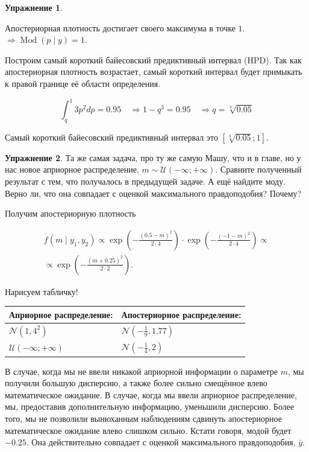 \documentclass[12pt, a4paper, oneside]{extreport}
\DeclareMathOperator{\Mod}{Mod}
\def \mN{\mathcal{N}}
\def \mU{\mathcal{U}}
\newcommand{\expp}[1]{ \exp \left( #1 \right)}
\theoremstyle{plain}              %
\theoremstyle{definition}         %
\newtheorem{problem}{\color{myblue} Упражнение}
\begin{document}
\begin{problem}
\begin{sol}
Апостериорная плотность достигает своего максимума в точке $1$. $\Rightarrow \Mod(p \mid y) = 1$.
			
			
Построим самый короткий байесовский предиктивный интервал (HPD). Так как апостериорная плотность возрастает, самый короткий интервал будет примыкать к правой границе её области определения.
			
\[ \int_q^1 3p^2 dp = 0.95 \quad \Rightarrow 1 - q^3 = 0.95 \quad \Rightarrow q = \sqrt[3]{0.05} \]

Самый короткий байесовский предиктивный интервал это $[\sqrt[3]{0.05};1]$.

\end{sol}
\end{problem}


\begin{problem}\label{upr_norm}
	Та же самая задача, про ту же самую Машу, что и в главе, но у нас новое априорное распределение, $m \sim \mU(-\infty; +\infty)$. Сравните полученный результат с тем, что получалось в предыдущей задаче. А ещё найдите моду. Верно ли, что она совпадает с оценкой максимального правдоподобия? Почему? 
	\begin{sol}
		
		Получим апостериорную плотность
		
		\begin{multline*}
		 f(m \mid y_1, y_2) \propto \expp{-\frac{(0.5 - m)^2}{2 \cdot 4}} \cdot \expp{-\frac{(-1 - m)^2}{2 \cdot 4}} \propto \\ \propto \expp{-\frac{(m+0.25)^2}{2 \cdot 2}}.
		 \end{multline*}
		
		Нарисуем табличку! 
		
		\begin{tabularx}{\textwidth}{X|X}
			Априорное распределение: & Апостериорное распределение: \\
			\hline 
			$\mN(1,4^2)$             &  $\mN(-\frac{1}{9},1.77)$ \\
			$\mU(-\infty;+\infty)$   &  $\mN(-\frac{1}{4},2)$
		\end{tabularx}
		
		В случае, когда мы не ввели никакой априорной информации о параметре $m$, мы получили большую дисперсию, а также более сильно смещённое влево математическое ожидание. В случае, когда мы ввели априорное распределение, мы, предоставив дополнительную информацию, уменьшили дисперсию. Более того, мы не позволили вынюханным наблюдениям сдвинуть апостериорное математическое ожидание влево слишком сильно. Кстати говоря, модой будет $-0.25$.  Она действительно совпадает с  оценкой максимального правдоподобия, $\bar y$.
	\end{sol}
\end{problem}
\end{document}
